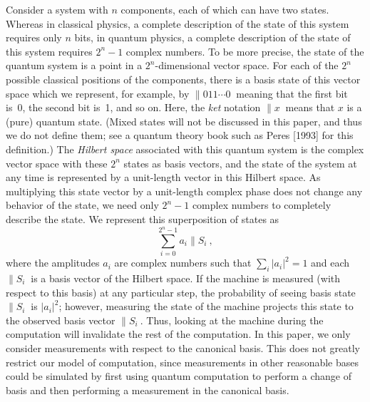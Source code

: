 Consider a system with $n$ components, each of which can have two states.
Whereas in classical physics, a complete description of the
state of this system requires
only $n$ bits, in quantum physics, a complete description of the state of 
this system requires $2^n-1$ complex numbers.  To be more
precise, the state of the quantum
system is a point in a $2^n$-dimensional vector space.
For each of the $2^n$ possible classical
positions of the components, there is a basis state 
of this vector space which we represent, for example,
by $\|0 1 1 \cdots 0\>$ meaning that the first bit is~0, the second
bit is~1, and so on.  Here, the {\em ket} notation $\|x\>$ means that
$x$ is a (pure) quantum state.  (Mixed states will not be discussed in
this paper, and thus we do not define them; see a quantum theory book
such as Peres [1993] for this definition.)
The {\em Hilbert space} associated with this quantum system is
the complex vector space with these $2^n$ states as basis vectors, and
the state of the system at any time is represented by a unit-length vector
in this Hilbert space.
As multiplying this state vector by a unit-length complex phase does 
not change any behavior of the state, we need only $2^n-1$ complex 
numbers to completely describe the state.
We represent this superposition of states as
\begin{equation}
\sum_{i=0}^{2^n-1} a_i \| S_i \>,
\end{equation}
where the amplitudes $a_i$ are complex numbers such that 
$\sum_i \left| a_i \right| ^2 =1$ and 
each $\| S_i \>$ is a basis vector of the Hilbert space. 
If the machine is measured (with respect to this basis)
at any particular step, the probability of 
seeing basis state $\| S_i \>$ is $\left| a_i \right| ^2$; however,
measuring the state of the machine projects this state to the 
observed basis vector $\|S_i\>$.
Thus, looking at the machine during the computation will invalidate the rest 
of the computation.  In this paper, we only consider measurements with
respect to the canonical basis.  This does not greatly restrict our
model of computation, since measurements in other reasonable
bases could be simulated by first using quantum computation to
perform a change of basis and then performing a measurement in the
canonical basis.

